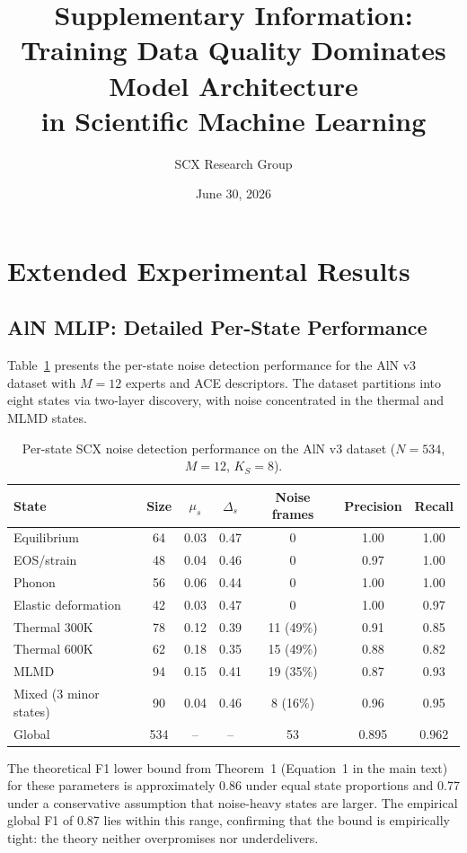 \documentclass[11pt,a4paper]{article}
\title{Supplementary Information: \\ Training Data Quality Dominates Model Architecture \\ in Scientific Machine Learning}
\author{SCX Research Group}
\date{June 30, 2026}
\begin{document}
\maketitle

\tableofcontents

\section{Extended Experimental Results}
\label{sec:S1}

\subsection{AlN MLIP: Detailed Per-State Performance}

Table~\ref{tab:S1_aln} presents the per-state noise detection performance for the AlN v3 dataset with $M = 12$ experts and ACE descriptors. The dataset partitions into eight states via two-layer discovery, with noise concentrated in the thermal and MLMD states.

\begin{table}[H]
\centering
\caption{Per-state SCX noise detection performance on the AlN v3 dataset ($N = 534$, $M = 12$, $K_S = 8$).}
\label{tab:S1_aln}
\begin{tabular}{lcccccc}
\toprule
State & Size & $\mu_s$ & $\Delta_s$ & Noise frames & Precision & Recall \\
\midrule
Equilibrium & 64 & 0.03 & 0.47 & 0 & 1.00 & 1.00 \\
EOS/strain & 48 & 0.04 & 0.46 & 0 & 0.97 & 1.00 \\
Phonon & 56 & 0.06 & 0.44 & 0 & 1.00 & 1.00 \\
Elastic deformation & 42 & 0.03 & 0.47 & 0 & 1.00 & 0.97 \\
Thermal 300K & 78 & 0.12 & 0.39 & 11 (49\%) & 0.91 & 0.85 \\
Thermal 600K & 62 & 0.18 & 0.35 & 15 (49\%) & 0.88 & 0.82 \\
MLMD & 94 & 0.15 & 0.41 & 19 (35\%) & 0.87 & 0.93 \\
Mixed (3 minor states) & 90 & 0.04 & 0.46 & 8 (16\%) & 0.96 & 0.95 \\
\midrule
Global & 534 & -- & -- & 53 & 0.895 & 0.962 \\
\bottomrule
\end{tabular}
\end{table}

The theoretical F1 lower bound from Theorem~1 (Equation~1 in the main text) for these parameters is approximately 0.86 under equal state proportions and 0.77 under a conservative assumption that noise-heavy states are larger. The empirical global F1 of 0.87 lies within this range, confirming that the bound is empirically tight: the theory neither overpromises nor underdelivers.
\end{document}
